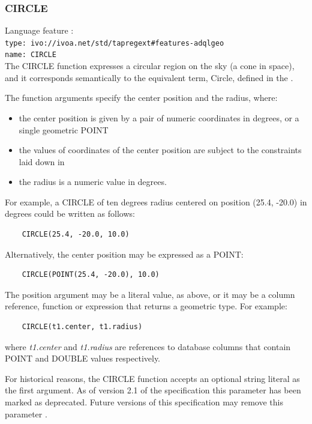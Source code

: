\documentclass[11pt,a4paper]{ivoa}
\begin{document}
\subsubsection{CIRCLE}
\label{sec:functions.geom.circle}
{\footnotesize Language feature :}\\
{\footnotesize \verb|type: ivo://ivoa.net/std/tapregext#features-adqlgeo|}\\
{\footnotesize \verb|name: CIRCLE|}\\

The CIRCLE function expresses a circular region on the sky (a cone in space),
and it corresponds semantically to the equivalent term, Circle, defined in
the \STCSpec{}.

The function arguments specify the center position and the radius, where:
\begin{itemize}
    \item the center position is given by a pair of numeric coordinates
          in degrees, or a single geometric POINT
    \item the values of coordinates of the center position are subject to the
          constraints laid down in 
    \item the radius is a numeric value in degrees.
\end{itemize}

For example, a CIRCLE of ten degrees radius centered on position
(25.4, -20.0) in degrees could be written as follows:
\begin{verbatim}
    CIRCLE(25.4, -20.0, 10.0)
\end{verbatim}

Alternatively, the center position may be expressed as a POINT:
\begin{verbatim}
    CIRCLE(POINT(25.4, -20.0), 10.0)
\end{verbatim}

The position argument may be a literal value, as above, or it may be a
column reference, function or expression that returns a geometric type.
For example:
\begin{verbatim}
    CIRCLE(t1.center, t1.radius)
\end{verbatim}
where \textit{t1.center} and \textit{t1.radius} are references to
database columns that contain POINT and DOUBLE values respectively.

For historical reasons, the CIRCLE function accepts an optional string literal
as the first argument.
As of version 2.1 of the specification this parameter has been
marked as deprecated.
Future versions of this specification may remove this parameter
.
\end{document}
